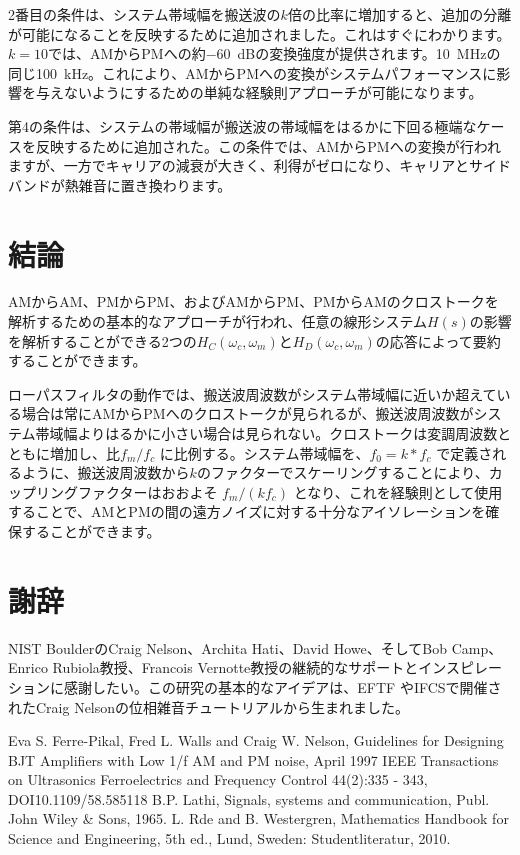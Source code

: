 \documentclass[article]{jlreq}
\begin{document}
2番目の条件は、システム帯域幅を搬送波の$k$倍の比率に増加すると、追加の分離が可能になることを反映するために追加されました。これはすぐにわかります。$k = 10$では、AMからPMへの約\SI{-60}{\dB}の変換強度が提供されます。\SI{10}{\MHz}の同じ\SI{100}{\kHz}。これにより、AMからPMへの変換がシステムパフォーマンスに影響を与えないようにするための単純な経験則アプローチが可能になります。

第4の条件は、システムの帯域幅が搬送波の帯域幅をはるかに下回る極端なケースを反映するために追加された。この条件では、AMからPMへの変換が行われますが、一方でキャリアの減衰が大きく、利得がゼロになり、キャリアとサイドバンドが熱雑音に置き換わります。

\section{結論}
AMからAM、PMからPM、およびAMからPM、PMからAMのクロストークを解析するための基本的なアプローチが行われ、任意の線形システム$H(s)$の影響を解析することができる2つの$H_C(\omega_c, \omega_m)$と$H_D(\omega_c,\omega_m)$の応答によって要約することができます。

ローパスフィルタの動作では、搬送波周波数がシステム帯域幅に近いか超えている場合は常にAMからPMへのクロストークが見られるが、搬送波周波数がシステム帯域幅よりはるかに小さい場合は見られない。クロストークは変調周波数とともに増加し、比$f_m/f_c$ に比例する。システム帯域幅を、$f_0 = k * f_c$ で定義されるように、搬送波周波数から$k$のファクターでスケーリングすることにより、カップリングファクターはおおよそ $f_m/(k f_c)$ となり、これを経験則として使用することで、AMとPMの間の遠方ノイズに対する十分なアイソレーションを確保することができます。

\section*{謝辞}

NIST BoulderのCraig Nelson、Archita Hati、David Howe、そしてBob Camp、Enrico Rubiola教授、Francois Vernotte教授の継続的なサポートとインスピレーションに感謝したい。この研究の基本的なアイデアは、EFTF やIFCSで開催されたCraig Nelsonの位相雑音チュートリアルから生まれました。

\begin{thebibliography}{9}
    Eva S. Ferre-Pikal, Fred L. Walls and Craig W. Nelson, Guidelines for Designing BJT Amplifiers with Low 1/f AM and PM noise, April 1997 IEEE Transactions on Ultrasonics Ferroelectrics and Frequency Control 44(2):335 - 343, DOI10.1109/58.585118
    B.P. Lathi, Signals, systems and communication, Publ. John Wiley \& Sons, 1965.
    L. Rde and B. Westergren, Mathematics Handbook for Science and Engineering, 5th ed., Lund, Sweden: Studentliteratur, 2010.
\end{thebibliography}
%
\end{document}
